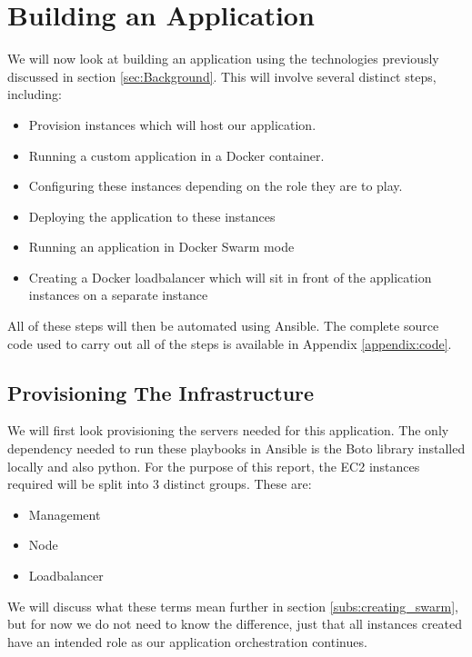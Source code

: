 \documentclass{article}
\begin{document}
\newpage
\section{Building an Application}
\label{sec:Build}
We will now look at building an application using the technologies previously discussed in section \ref{sec:Background}. This will involve several distinct steps, including:

\begin{itemize}
  \item Provision instances which will host our application.
  \item Running a custom application in a Docker container.
  \item Configuring these instances depending on the role they are to play.
  \item Deploying the application to these instances
  \item Running an application in Docker Swarm mode
  \item Creating a Docker loadbalancer which will sit in front of the application instances on a separate instance
\end{itemize}

All of these steps will then be automated using Ansible. The complete source code used to carry out all of the steps is available in Appendix \ref{appendix:code}.



\subsection{Provisioning The Infrastructure}
\label{subs:provision}
We will first look provisioning the servers needed for this application. The only dependency needed to run these playbooks in Ansible is the Boto library \citep{Boto2016} installed locally and also python. For the purpose of this report, the EC2 instances required will be split into 3 distinct groups. These are:

\begin{itemize}
  \item Management
  \item Node
  \item Loadbalancer
\end{itemize}

We will discuss what these terms mean further in section \ref{subs:creating_swarm}, but for now we do not need to know the difference, just that all instances created have an intended role as our application orchestration continues.
\end{document}
